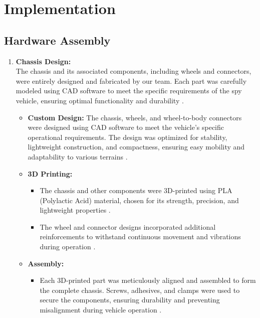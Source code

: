 \documentclass[12pt,a4paper]{report}
\begin{document}
	\section{Implementation}
\label{Hardware Assembly}
\subsection{Hardware Assembly}

\begin{enumerate}
    \item \textbf{Chassis Design:} \\
     The chassis and its associated components, including wheels and connectors, were entirely designed and fabricated by our team. Each part was carefully modeled using CAD software to meet the specific requirements of the spy vehicle, ensuring optimal functionality and durability \cite{3dprinting, circuitdesign}.
    \begin{itemize}

        \item \textbf{Custom Design:} The chassis, wheels, and wheel-to-body connectors were designed using CAD software to meet the vehicle’s specific operational requirements. The design was optimized for stability, lightweight construction, and compactness, ensuring easy mobility and adaptability to various terrains \cite{circuitdesign}.
        \item \textbf{3D Printing:} 
        \begin{itemize}
            \item The chassis and other components were 3D-printed using PLA (Polylactic Acid) material, chosen for its strength, precision, and lightweight properties \cite{3dprinting}.
            \item The wheel and connector designs incorporated additional reinforcements to withstand continuous movement and vibrations during operation \cite{3dprinting}.
        \end{itemize}
        \item \textbf{Assembly:} 
        \begin{itemize}
            \item Each 3D-printed part was meticulously aligned and assembled to form the complete chassis. Screws, adhesives, and clamps were used to secure the components, ensuring durability and preventing misalignment during vehicle operation \cite{3dprinting}.
        \end{itemize}
    \end{itemize}



\end{enumerate}
\end{document}
